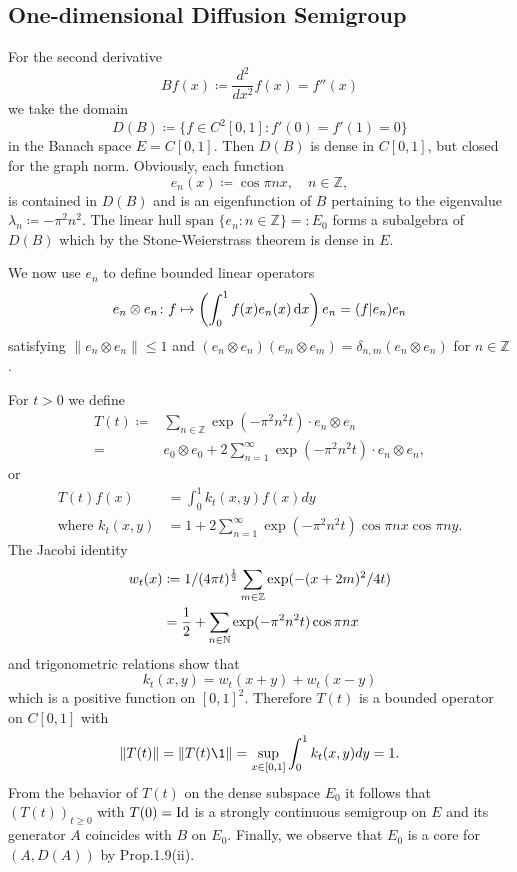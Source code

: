 \subsection{One-dimensional Diffusion Semigroup}\label{subsec:a1-2.7}
For the second derivative 
\[
    Bf(x) \coloneqq \frac{d^{2}}{dx^{2}}f(x) = f''(x)
\]
we take the domain
\[
    D(B) \coloneqq \{f \in C^{2}\left[ 0,1 \right] \colon f'(0) = f'(1) = 0\}
\]
in the Banach space $E = C\left[ 0,1 \right]$.
Then $D(B)$ is dense in $C\left[ 0,1 \right]$, but closed for the graph norm.
Obviously, each function
\[
    e_{n}(x) \coloneqq \cos \pi nx, \quad n \in \mathbb{Z},
\]
is contained in $D(B)$ and is an eigenfunction of $B$ pertaining to the eigenvalue $\lambda_{n} \coloneqq -\pi^{2}n^{2}$.
The linear hull $\text{span }\{e_{n} \colon n \in \mathbb{Z}\} = \colon E_{0}$ forms a subalgebra of $D(B)$ which by the Stone-Weierstrass theorem is dense in $E$.

We now use $e_{n}$ to define bounded linear operators 
%
\[
	e_{n} \otimes e_{n} \colon f \mapsto \left(\int_{0}^{1} f(x)e_{n}(x) \dx \right)e_{n} 
		= ( f | e_{n} ) e_{n} %
\]
satisfying $\|e_{n} \otimes e_{n}\| \leq 1$ and
$(e_{n} \otimes e_{n})(e_{m} \otimes e_{m}) = \delta_{n,m}(e_{n} \otimes e_{n})$ for $n \in \mathbb{Z}$.

For $t > 0$ we define
\begin{align*}
T(t) \coloneqq{}& \sum_{n \in \mathbb{Z}} \exp(-\pi^{2}n^{2}t) \cdot e_{n} \otimes e_{n} \\
		={}& e_{0} \otimes e_{0} + 2\sum_{n=1}^{\infty} \exp(-\pi^{2}n^{2}t) \cdot e_{n} \otimes e_{n},
\end{align*}
or
\begin{align*}
    T(t)f(x) &= \int_{0}^{1} k_{t}(x,y)f(x)dy \\
    \text{where } k_{t}(x,y) &= 1 + 2\sum_{n=1}^{\infty} \exp(-\pi^{2}n^{2}t) \cos\pi nx \cos\pi ny .
\end{align*}
The Jacobi identity
\begin{align*}
    w_{t}(x) &\coloneqq 1/(4\pi t)^{\frac{1}{2}} \sum_{m \in \mathbb{Z}} \exp(-(x+2m)^{2}/4t) \\
    &= \frac{1}{2} + \sum_{n \in \mathbb{N}} \exp(-\pi^{2}n^{2}t) \cos\pi nx
\end{align*}
and trigonometric relations show that
\[
    k_{t}(x,y) = w_{t}(x+y) + w_{t}(x-y)
\]
which is a positive function on $\left[ 0,1 \right]^{2}$.
Therefore $T(t)$ is a bounded operator on $C\left[ 0,1 \right]$ with
\[
    \|T(t)\| = \|T(t)\1\| = \sup_{x \in \left[ 0,1 \right]} \int_{0}^{1} k_{t}(x,y)dy = 1 .
\]
From the behavior of $T(t)$ on the dense subspace $E_{0}$ it follows that $(T(t))_{t \geq 0}$ with $T(0) = \operatorname{Id}$ is a strongly continuous semigroup on $E$ and its generator $A$ coincides with $B$ on $E_{0}$.
Finally, we observe that $E_{0}$ is a core for $(A,D(A))$ by Prop.1.9(ii).

